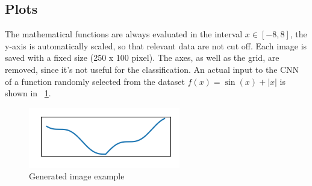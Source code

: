 \subsection{Plots}

The mathematical functions are always evaluated in the interval $x \in [-8,8]$, the y-axis is automatically scaled, so that relevant data are not cut off. Each image is saved with a fixed size (250 x 100 pixel). The axes, as well as the grid, are removed, since it's not useful for the classification. An actual input to the CNN of a function randomly selected from the dataset $f(x) = \sin(x)+|x|$ is shown in \Fig~\ref{fig:function_example}.
\begin{figure}[h!]
	\centering
	\includegraphics[width=0.3\linewidth]{./ImageFiles/Data Generation/function_example}
	\caption{Generated image example}
	\label{fig:function_example}
\end{figure}
